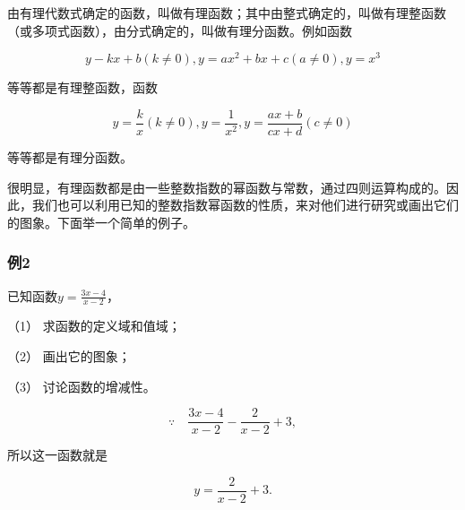 由有理代数式确定的函数，叫做有理函数；其中由整式确定的，叫做有理整函数
（或多项式函数），由分式确定的，叫做有理分函数。例如函数

\[
y - k x + b (k \neq 0), y = a x^{2} + b x + c (a \neq 0), y = x^{3}
\]

等等都是有理整函数，函数

\[
y = \frac{k}{x} (k \neq 0), y = \frac{1}{x^{2}}, y = \frac{a x + b}{c x + d} (c \neq 0)
\]

等等都是有理分函数。

很明显，有理函数都是由一些整数指数的幂函数与常数，通过四则运算构成的。因此，我们也可以利用已知的整数指数幂函数的性质，来对他们进行研究或画出它们的图象。下面举一个简单的例子。

\subsubsection{例2}

已知函数\(y = \frac{3x - 4}{x - 2}\)，

（1） 求函数的定义域和值域；

（2） 画出它的图象；

（3） 讨论函数的增减性。


\[
\because \quad \frac{3 x - 4}{x - 2} - \frac{2}{x - 2} + 3,
\]

所以这一函数就是

\[
y = \frac{2}{x - 2} + 3.
\]

